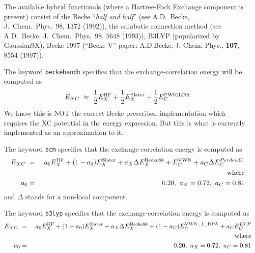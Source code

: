   The available hybrid functionals 
(where a Hartree-Fock Exchange component is present) consist of the Becke
``{\it half and half}'' (see A.D.~Becke, J.~Chem.~Phys.~98, 1372 (1992)), the
adiabatic connection method (see A.D.~Becke, J.~Chem.~Phys.~98, 5648
(1993)),  B3LYP (popularized by Gaussian9X), Becke 1997 
(``Becke V'' paper: A.D.Becke, J. Chem. Phys., {\bf 107}, 8554 (1997)).


The keyword \verb+beckehandh+ specifies that the exchange-correlation energy will be
computed as 
\begin{eqnarray*}
E_{XC} \ \approx \ \frac{1}{2} E^{\rm HF}_X + \frac{1}{2} E^{\rm
  Slater}_{X} + \frac{1}{2} E^{\rm PW91LDA}_{C}
\end{eqnarray*}
We know this is NOT the correct Becke prescribed implementation which
requires the XC potential in the energy expression.  But this is what
is currently implemented as an approximation to it.

%

The keyword \verb+acm+ specifies that the exchange-correlation energy
is computed as
\begin{eqnarray*}
E_{XC} \ &=& \ a_0 E^{\rm HF}_X + (1-a_0) E^{\rm Slater}_{X} +
a_X \Delta E^{\rm Becke88}_{X} + E^{\rm VWN}_C + a_C \Delta E^{Perdew91}_C \\
& &{\rm where } \\
a_0 &=& 0.20, \ a_X = 0.72, \ a_C = 0.81
\end{eqnarray*}
and $\Delta$ stands for a non-local component.


The keyword \verb+b3lyp+ specifies that the exchange-correlation energy
is computed as
\begin{eqnarray*}
E_{XC} \ &=& \ a_0 E^{\rm HF}_X + (1-a_0) E^{\rm Slater}_{X} +
a_X \Delta E^{\rm Becke88}_{X} + (1-a_C)E^{\rm VWN\_1\_RPA}_C + a_C E^{LYP}_C \\
& &{\rm where } \\
a_0 &=& 0.20, \ a_X = 0.72, \ a_C = 0.81
\end{eqnarray*}


